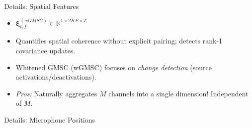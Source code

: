 \documentclass[8pt,hyperref={pdfpagelabels=true},xcolor=table,aspectratio=169]{beamer}
\begin{document}
\begin{frame}{Details: Spatial Features}
{\begin{itemize}
              \begin{itemize}
                  \item $\bm{\xi}_{t,f}^{(wGMSC)} \in \mathbb{R}^{1 \times 2KF \times T}$
                  \item Quantifies spatial coherence without explicit pairing; detects rank-1 covariance updates.
                  \item Whitened GMSC (wGMSC) focuses on \textit{change detection} (source activations/deactivations).
                  \item \textit{Pros:} Naturally aggregates $M$ channels into a single dimension! Independent of $M$.
              \end{itemize}
    \end{itemize}
    }
\end{frame}

\begin{frame}{Details: Microphone Positions}

\end{frame}
\end{document}
